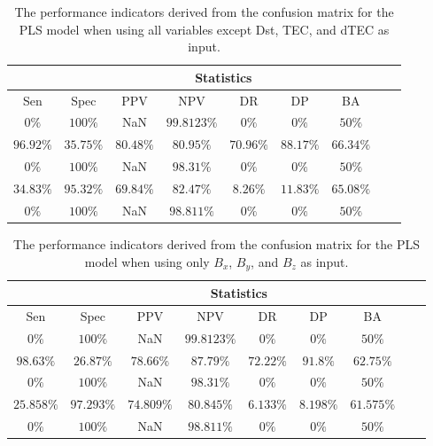 \begin{table}[!ht]
	\centering
	\begin{tabular}{|c|c|c|c|c|c|c|c|c|}
		\hline
		 & \multicolumn{7}{c|}{Statistics} \\ \hline
		Sen & Spec & PPV & NPV & DR & DP & BA \\ \hline
		$0\%$ & $100\%$ & NaN & $99.8123\%$ & $0\%$ & $0\%$ & $50\%$ \\ \hline
		$96.92\%$ & $35.75\%$ & $80.48\%$ & $80.95\%$ & $70.96\%$ & $88.17\%$ & $66.34\%$ \\ \hline
		$0\%$ & $100\%$ & NaN & $98.31\%$ & $0\%$ & $0\%$ & $50\%$ \\ \hline
		$34.83\%$ & $95.32\%$ & $69.84\%$ & $82.47\%$ & $8.26\%$ & $11.83\%$ & $65.08\%$ \\ \hline
		$0\%$ & $100\%$ & NaN & $98.811\%$ & $0\%$ & $0\%$ & $50\%$ \\ \hline
	\end{tabular}
	\caption{The performance indicators derived from the confusion matrix for the PLS model when using all variables except Dst, TEC, and dTEC as input.}
	\label{tab:cs:noTEC:pls}
\end{table}

\begin{table}[!ht]
	\centering
	\begin{tabular}{|c|c|c|c|c|c|c|c|c|}
		\hline
		 & \multicolumn{7}{c|}{Statistics} \\ \hline
		Sen & Spec & PPV & NPV & DR & DP & BA \\ \hline
		$0\%$ & $100\%$ & NaN & $99.8123\%$ & $0\%$ & $0\%$ & $50\%$ \\ \hline
		$98.63\%$ & $26.87\%$ & $78.66\%$ & $87.79\%$ & $72.22\%$ & $91.8\%$ & $62.75\%$ \\ \hline
		$0\%$ & $100\%$ & NaN & $98.31\%$ & $0\%$ & $0\%$ & $50\%$ \\ \hline
		$25.858\%$ & $97.293\%$ & $74.809\%$ & $80.845\%$ & $6.133\%$ & $8.198\%$ & $61.575\%$ \\ \hline
		$0\%$ & $100\%$ & NaN & $98.811\%$ & $0\%$ & $0\%$ & $50\%$ \\ \hline
	\end{tabular}
	\caption{The performance indicators derived from the confusion matrix for the PLS model when using only $B_{x}$, $B_{y}$, and $B_{z}$ as input.}
	\label{tab:cs:coord:pls}
\end{table}

